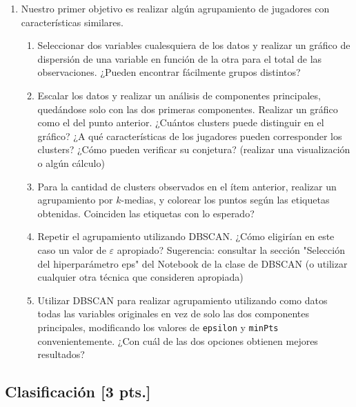 \documentclass[a4paper,11pt]{article}
\theoremstyle{definition}
\begin{document}
\begin{enumerate}[resume]
\item Nuestro primer objetivo es realizar algún agrupamiento de jugadores con características similares.
\begin{enumerate}
\item Seleccionar dos variables cualesquiera de los datos y realizar un gráfico de dispersión de una variable en función de la otra para el total de las observaciones. ¿Pueden encontrar fácilmente grupos distintos?

\item Escalar los datos y realizar un análisis de componentes principales, quedándose solo con las dos primeras componentes.
Realizar un gráfico como el del punto anterior. ¿Cuántos clusters puede distinguir en el gráfico? ¿A qué características de los jugadores pueden corresponder los clusters? ¿Cómo pueden verificar su conjetura? (realizar una visualización o algún cálculo)

\item Para la cantidad de clusters observados en el \'item anterior, realizar un agrupamiento por $k$-medias, y colorear los puntos según las etiquetas obtenidas. Coinciden las etiquetas con lo esperado?

\item Repetir el agrupamiento utilizando DBSCAN. ¿Cómo eligirían en este caso un valor de $\varepsilon$ apropiado? Sugerencia: consultar la sección "Selección del hiperparámetro eps" del Notebook de la clase de DBSCAN (o utilizar cualquier otra técnica que consideren apropiada)

\item Utilizar DBSCAN para realizar agrupamiento utilizando como datos todas las variables
originales en vez de solo las dos componentes principales, modificando los valores de \verb|epsilon| y \verb|minPts|
convenientemente. ¿Con cuál de las dos opciones obtienen mejores resultados?

\end{enumerate}

\end{enumerate}

\subsection*{Clasificación [3 pts.]}
\end{document}
